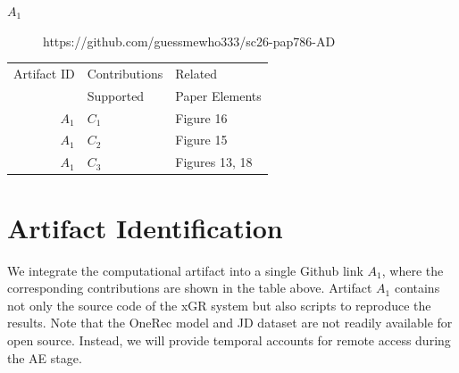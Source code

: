 \documentclass[conference]{IEEEtran}
\begin{document}
\begin{description}
\item[$A_1$] https://github.com/guessmewho333/sc26-pap786-AD
\end{description}


\begin{center}
\begin{tabular}{rll}
\toprule
Artifact ID    & Contributions &  Related \\
              &  Supported     &  Paper Elements \\
\midrule
$A_1$   &   $C_1$ & Figure 16 \\
\midrule
$A_1$    &  $C_2$ & Figure 15 \\
\midrule
$A_1$ & $C_3$ & Figures 13, 18\\
\bottomrule
\end{tabular}
\end{center}


\section{Artifact Identification}

We integrate the computational artifact into a single Github link $A_1$, where the corresponding contributions are shown in the table above. Artifact $A_1$ contains not only the source code of the xGR system but also scripts to reproduce the results. Note that the OneRec model and JD dataset are not readily available for open source. Instead, we will provide temporal accounts for remote access during the AE stage.


\newartifact
\end{document}
